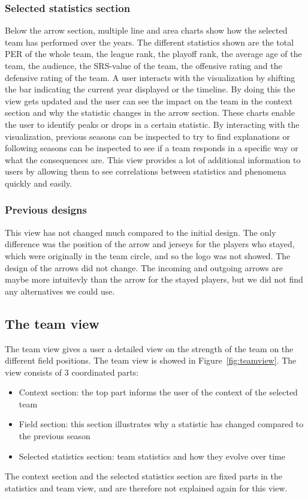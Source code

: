 \documentclass[chi_draft]{sigchi}
\begin{document}
\subsubsection{Selected statistics section}
Below the arrow section, multiple line and area charts show how the selected 
team has performed over the years. The different statistics shown are the 
total PER of the whole team, the league rank, the playoff rank, the average age 
of the team, the audience, the SRS-value of the team, the offensive rating and 
the defensive rating of the team. A user interacts with the visualization by 
shifting the bar indicating the current year displayed or the timeline. By 
doing this the view gets updated and the user can see the impact on the team 
in the context section and why the statistic changes in the arrow section. 
These charts enable the user to identify peaks or drops in a certain statistic. 
By interacting with the visualization, previous seasons can be inspected to try 
to find explanations or following seasons can be inspected to see if a team 
responds in a specific way or what the consequences are. This view provides 
a lot of additional information to users by allowing them to see correlations 
between statistics and phenomena quickly and easily.

\subsubsection{Previous designs}
This view has not changed much compared to the initial design. The only difference 
was the position of the arrow and jerseys for the players who stayed, which were 
originally in the team circle, and so the logo was not showed. 
The design of the arrows did not change. The incoming and outgoing 
arrows are maybe more intuitevly than the arrow for the stayed players, but we did 
not find any alternatives we could use.

\subsection{The team view}
The team view gives a user a detailed view on the strength of the team on the 
different field positions. The team view is showed in Figure~\ref{fig:teamview}. 
The view consists of 3 coordinated parts:
\begin{itemize}
    \item Context section: the top part informs the user of the context of the
        selected team
    \item Field section: this section illustrates why a statistic has changed
        compared to the previous season
    \item Selected statistics section: team statistics and how they evolve over
        time
\end{itemize}
The context section and the selected statistics section are fixed parts in the 
statistics and team view, and are therefore not explained again for this view.
\end{document}
